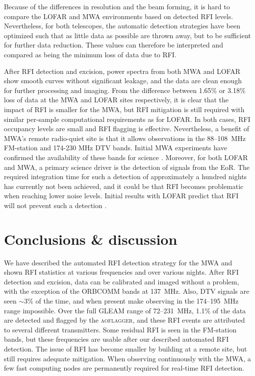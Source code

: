 \documentclass{pasa}
\begin{document}
Because of the differences in resolution and the beam forming, it is hard to compare the LOFAR and MWA environments based on detected RFI levels. Nevertheless, for both telescopes, the automatic detection strategies have been optimized such that as little data as possible are thrown away, but to be sufficient for further data reduction. These values can therefore be interpreted and compared as being the minimum loss of data due to RFI.

After RFI detection and excision, power spectra from both MWA and LOFAR show smooth curves without significant leakage, and the data are clean enough for further processing and imaging. From the difference between 1.65\% or 3.18\% loss of data at the MWA and LOFAR sites respectively, it is clear that the impact of RFI is smaller for the MWA, but RFI mitigation is still required with similar per-sample computational requirements as for LOFAR. In both cases, RFI occupancy levels are small and RFI flagging is effective. Nevertheless, a benefit of MWA's remote radio-quiet site is that it allows observations in the 88--108~MHz FM-station and 174-230 MHz DTV bands. Initial MWA experiments have confirmed the availability of these bands for science \citep{mckinley-moon-2013,hurley-walker-mwacs-2014}. Moreover, for both LOFAR and MWA, a primary science driver is the detection of signals from the EoR. The required integration time for such a detection of approximately a hundred nights has currently not been achieved, and it could be that RFI becomes problematic when reaching lower noise levels. Initial results with LOFAR predict that RFI will not prevent such a detection \citep{ncp-eor-yatawatta, offringa-rfi-distributions}.

\section{Conclusions \& discussion} \label{ch:conclusions-and-discussion}
We have described the automated RFI detection strategy for the MWA and shown RFI statistics at various frequencies and over various nights. After RFI detection and excision, data can be calibrated and imaged without a problem, with the exception of the ORBCOMM bands at 137~MHz. Also, DTV signals are seen $\sim3\%$ of the time, and when present make observing in the 174--195~MHz range impossible. Over the full GLEAM range of 72--231~MHz, 1.1\% of the data are detected and flagged by the \textsc{aoflagger}, and these RFI events are attributed to several different transmitters. Some residual RFI is seen in the FM-station bands, but these frequencies are usable after our described automated RFI detection. The issue of RFI has become smaller by building at a remote site, but still requires adequate mitigation. When observing continuously with the MWA, a few fast computing nodes are permanently required for real-time RFI detection.
\end{document}

